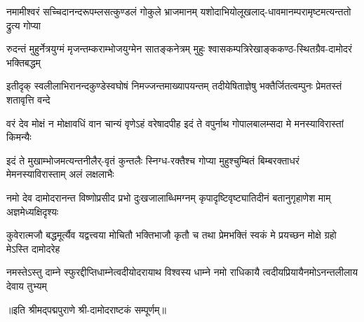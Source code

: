 
\fourlineindentedshloka
{नमामीश्वरं सच्चिदानन्दरूपम्}{लसत्कुण्डलं गोकुले भ्राजमानम्}
{यशोदाभियोलूखलाद्-धावमानम्}{परामृष्टमत्यन्ततो द्रुत्य गोप्या}

\fourlineindentedshloka
{रुदन्तं मुहुर्नेत्रयुग्मं मृजन्तम्}{कराम्भोजयुग्मेन सातङ्कनेत्रम्}
{मुहुः श्वासकम्पत्रिरेखाङ्ककण्ठ-}{स्थितग्रैव-दामोदरं भक्तिबद्धम्}

\fourlineindentedshloka
{इतीदृक् स्वलीलाभिरानन्दकुण्डे}{स्वघोषं निमज्जन्तमाख्यापयन्तम्}
{तदीयेषिताज्ञेषु भक्तैर्जितत्वम्}{पुनः प्रेमतस्तं शतावृत्ति वन्दे}

\fourlineindentedshloka
{वरं देव मोक्षं न मोक्षावधिं वा}{न चान्यं वृणेऽहं वरेषादपीह}
{इदं ते वपुर्नाथ गोपालबालम्}{सदा मे मनस्याविरास्तां किमन्यैः}

\fourlineindentedshloka
{इदं ते मुखाम्भोजमत्यन्तनीलैर्-}{वृतं कुन्तलैः स्निग्ध-रक्तैश्च गोप्या}
{मुहुश्चुम्बितं बिम्बरक्ताधरं मे}{मनस्याविरास्ताम् अलं लक्षलाभैः}

\fourlineindentedshloka
{नमो देव दामोदरानन्त विष्णो}{प्रसीद प्रभो दुःखजालाब्धिमग्नम्}
{कृपादृष्टिवृष्ट्यातिदीनं बतानु}{गृहाणेश माम् अज्ञमेध्यक्षिदृश्यः}

\fourlineindentedshloka
{कुवेरात्मजौ बद्धमूर्त्यैव यद्वत्}{त्वया मोचितौ भक्तिभाजौ कृतौ च}
{तथा प्रेमभक्तिं स्वकं मे प्रयच्छ}{न मोक्षे ग्रहो मेऽस्ति दामोदरेह}

\fourlineindentedshloka
{नमस्तेऽस्तु दाम्ने स्फुरद्दीप्तिधाम्ने}{त्वदीयोदरायाथ विश्वस्य धाम्ने}
{नमो राधिकायै त्वदीयप्रियायै}{नमोऽनन्तलीलाय देवाय तुभ्यम्}

॥इति श्रीमद्पद्मपुराणे श्री-दामोदराष्टकं सम्पूर्णम्॥